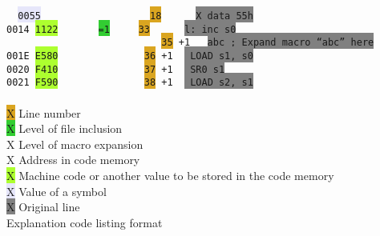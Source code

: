     \begin{code}[h]
        \mysmallfont{}
        \verb'  '\texttt{\colorbox{Lavender}{0055}}\verb'                   '\texttt{\colorbox{Goldenrod}{18}}\verb'      '\texttt{\colorbox{Gray}{X      data     55h}} \\
        \texttt{\colorbox{Apricot}{0014}}\verb' '\texttt{\colorbox{GreenYellow}{1122}}\verb'       '\texttt{\colorbox{LimeGreen}{=1}}\verb'     '\texttt{\colorbox{Goldenrod}{33}}\verb'      '\texttt{\colorbox{Gray}{l:     inc      s0}} \\
        \verb'                           '\texttt{\colorbox{Goldenrod}{35}}\verb' '\texttt{\colorbox{ProcessBlue}{+1}}\verb'   '\texttt{\colorbox{Gray}{abc     ; Expand macro ``abc'' here}} \\
        \texttt{\colorbox{Apricot}{001E}}\verb' '\texttt{\colorbox{GreenYellow}{E580}}\verb'               '\texttt{\colorbox{Goldenrod}{36}}\verb' '\texttt{\colorbox{ProcessBlue}{+1}}\verb'  '\texttt{\colorbox{Gray}{                LOAD     s1, s0}} \\
        \texttt{\colorbox{Apricot}{0020}}\verb' '\texttt{\colorbox{GreenYellow}{F410}}\verb'               '\texttt{\colorbox{Goldenrod}{37}}\verb' '\texttt{\colorbox{ProcessBlue}{+1}}\verb'  '\texttt{\colorbox{Gray}{                SR0     s1}} \\
        \texttt{\colorbox{Apricot}{0021}}\verb' '\texttt{\colorbox{GreenYellow}{F590}}\verb'               '\texttt{\colorbox{Goldenrod}{38}}\verb' '\texttt{\colorbox{ProcessBlue}{+1}}\verb'  '\texttt{\colorbox{Gray}{                LOAD     s2, s1}} \\\\
        \colorbox{Goldenrod}{\color{Goldenrod}X} Line number \\
        \colorbox{LimeGreen}{\color{LimeGreen}X} Level of file inclusion \\
        \colorbox{ProcessBlue}{\color{ProcessBlue}X} Level of macro expansion \\
        \colorbox{Apricot}{\color{Apricot}X} Address in code memory \\
        \colorbox{GreenYellow}{\color{GreenYellow}X} Machine code or another value to be stored in the code memory \\
        \colorbox{Lavender}{\color{Lavender}X} Value of a symbol \\
        \colorbox{Gray}{\color{Gray}X} Original line \\

        \caption{Explanation code listing format}
    \end{code}

